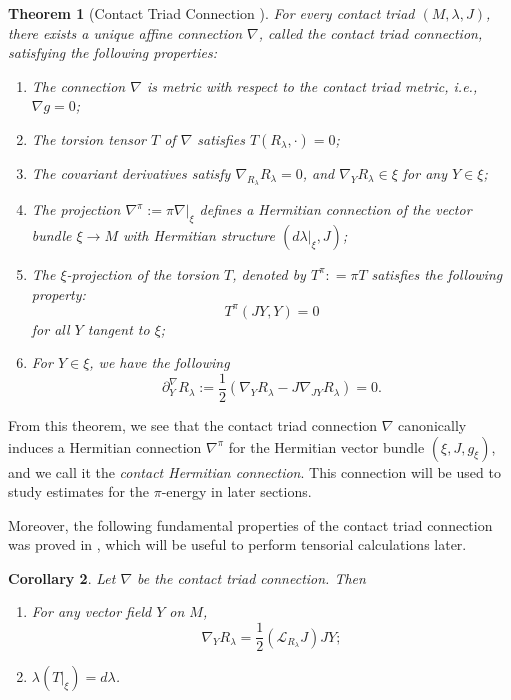 \documentclass[reqno]{amsart}
\newcommand{\del}{\partial}
\newcommand{\be}{\begin{equation}}
\newcommand{\ee}{\end{equation}}
\theoremstyle{theorem}
\newtheorem{thm}{Theorem}[section]
\newtheorem{cor}[thm]{Corollary}
\theoremstyle{definition}
\numberwithin{equation}{section}
\def\CL{{\mathcal L}}
\begin{document}
\begin{thm}[Contact Triad Connection \cite{oh-wang:connection}]\label{thm:connection}
For every contact triad $(M,\lambda,J)$, there exists a unique affine connection $\nabla$, called the contact triad connection,
 satisfying the following properties:
\begin{enumerate}
\item The connection $\nabla$ is  metric with respect to the contact triad metric, i.e., $\nabla g=0$;
\item The torsion tensor $T$ of $\nabla$ satisfies $T(R_\lambda, \cdot)=0$;
\item The covariant derivatives satisfy $\nabla_{R_\lambda} R_\lambda = 0$, and $\nabla_Y R_\lambda\in \xi$ for any $Y\in \xi$;
\item The projection $\nabla^\pi := \pi \nabla|_\xi$ defines a Hermitian connection of the vector bundle
$\xi \to M$ with Hermitian structure $(d\lambda|_\xi, J)$;
\item The $\xi$-projection of the torsion $T$, denoted by $T^\pi: = \pi T$ satisfies the following property:
\be\label{eq:TJYYxi}
T^\pi(JY,Y) = 0
\ee
for all $Y$ tangent to $\xi$;
\item For $Y\in \xi$, we have the following
$$
\del^\nabla_Y R_\lambda:= \frac12(\nabla_Y R_\lambda- J\nabla_{JY} R_\lambda)=0.
$$
\end{enumerate}
\end{thm}
From this theorem, we see that the contact triad connection $\nabla$ canonically induces
a Hermitian connection $\nabla^\pi$ for the Hermitian vector bundle $(\xi, J, g_\xi)$, and we call it the \emph{contact Hermitian connection}. This connection will be used to study estimates for the $\pi$-energy in later sections.

Moreover, the following fundamental properties of the contact triad connection was
proved in \cite{oh-wang:connection}, which will be useful to perform tensorial calculations later.

\begin{cor}\label{cor:connection}
Let $\nabla$ be the contact triad connection. Then
\begin{enumerate}
\item For any vector field $Y$ on $M$,
\be\label{eq:nablaYX}
\nabla_Y R_\lambda = \frac{1}{2}(\CL_{R_\lambda}J)JY;
\ee
\item $\lambda(T|_\xi)=d\lambda$.
\end{enumerate}
\end{cor}
\end{document}
